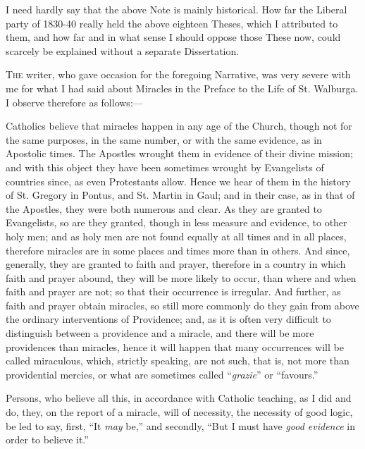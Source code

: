 I need hardly say that the above Note is mainly historical. How far the
Liberal party of 1830-40 really held the above eighteen Theses, which I
attributed to them, and how far and in what sense I should oppose those
These now, could scarcely be explained without a separate Dissertation.


T\textsc{he} writer, who gave occasion for the
foregoing Narrative, was very severe with me for what I had said about
Miracles in the Preface to the Life of St. Walburga. I observe therefore
as follows:—

Catholics believe that miracles happen in any age of the Church, though not for the same purposes, in
the same number, or with the same evidence, as in Apostolic times. The
Apostles wrought them in evidence of their divine mission; and with this
object they have been sometimes wrought by Evangelists of countries
since, as even Protestants allow. Hence we hear of them in the history
of St. Gregory in Pontus, and St. Martin in Gaul; and in their case, as
in that of the Apostles, they were both numerous and clear. As they are
granted to Evangelists, so are they granted, though in less measure and
evidence, to other holy men; and as holy men are not found equally at
all times and in all places, therefore miracles are in some places and
times more than in others. And since, generally, they are granted to
faith and prayer, therefore in a country in which faith and prayer
abound, they will be more likely to occur, than where and when faith and
prayer are not; so that their occurrence is irregular. And further, as
faith and prayer obtain miracles, so still more commonly do they gain
from above the ordinary interventions of Providence; and, as it is often
very difficult to distinguish between a providence and a miracle, and
there will be more providences than miracles, hence it will happen that
many occurrences will be called miraculous, which, strictly
speaking, are not such, that is, not more than providential mercies,
or what are sometimes called ``\emph{grazie}'' or
``favours.''

Persons, who believe all this, in accordance with Catholic teaching,
as I did and do, they, on the report of a miracle, will of necessity,
the necessity of good logic, be led to say, first, ``It \emph{may}
be,'' and secondly, ``But I must have \emph{good evidence} in
order to believe it.''

